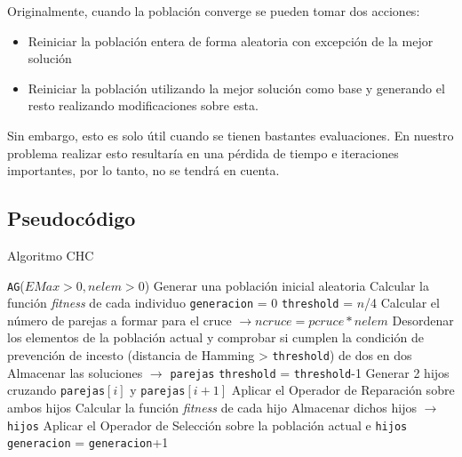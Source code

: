 Originalmente, cuando la población converge se pueden tomar dos acciones:
\begin{itemize}
	\item Reiniciar la población entera de forma aleatoria con excepción de la mejor solución
	\item Reiniciar la población utilizando la mejor solución como base y generando el resto realizando modificaciones sobre esta.
\end{itemize}
Sin embargo, esto es solo útil cuando se tienen bastantes evaluaciones. 
En nuestro problema realizar esto resultaría en una pérdida de tiempo e iteraciones importantes, por lo tanto, no se tendrá en cuenta. 

\subsection{Pseudocódigo}

\begin{algorithm}[H]
\caption{Algoritmo CHC}\label{alg:CHC}
\begin{algorithmic}[1]
\Procedure \texttt{AG}($EMax > 0, nelem > 0$)
\State Generar una población inicial aleatoria
\State Calcular la función \textit{fitness} de cada individuo
\State \texttt{generacion} = 0
\State \texttt{threshold} = $n$/4
	\State Calcular el número de parejas a formar para el cruce $\xrightarrow{}{} ncruce = pcruce*nelem$
	\State Desordenar los elementos de la población actual y comprobar si cumplen la condición de prevención de incesto (distancia de Hamming > \texttt{threshold}) de dos en dos
		\State Almacenar las soluciones $\xrightarrow{}{}$ \texttt{parejas}
	\EndIf
			\State \texttt{threshold} = \texttt{threshold}-1
		\EndIf
	\Else
			\State Generar 2 hijos cruzando \texttt{parejas}$[i]$ y \texttt{parejas}$[i+1]$
			\State Aplicar el Operador de Reparación sobre ambos hijos
			\State Calcular la función \textit{fitness} de cada hijo
			\State Almacenar dichos hijos $\xrightarrow{}{}$ \texttt{hijos}
		\EndFor
		\State Aplicar el Operador de Selección sobre la población actual e \texttt{hijos}
	\EndIf
	\State \texttt{generacion} = \texttt{generacion}+1
\EndWhile
\EndProcedure
\end{algorithmic}
\end{algorithm}
